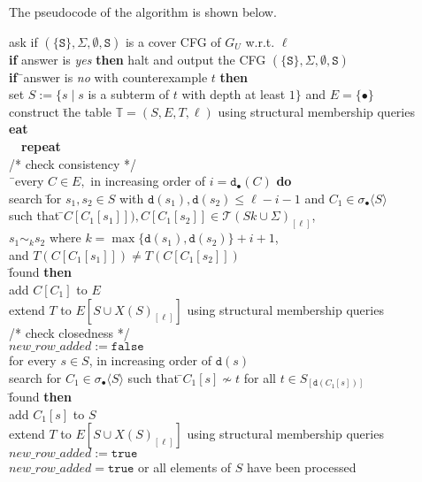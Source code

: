 \documentclass[preprint,12pt,english]{article}
\def\hole{\bullet}
\def\tS{\mathtt{S}}
\def\cT{\mathcal{T}}
\def\depth{\mathtt{d}}
\newcommand\pair[1]{\langle{#1}\rangle}
\begin{document}
The pseudocode of the algorithm is shown below. 
\begin{tabbing}
ask if $(\{\tS\},\Sigma,\emptyset,\tS)$ is a cover CFG of $G_U$ w.r.t. $\ell$\\
{\bf if} answer is {\em yes} {\bf then} halt and output the CFG $(\{\tS\},\Sigma,\emptyset,\tS)$\\
{\bf if}\=\ answer is {\em no} with counterexample $t$ {\bf then}\\
\>set $S:=\{s\mid s$ is a subterm of $t$ with depth at least $1\}$ and $E=\{\hole\}$\\
\>construct \=the table $\mathbb{T}=(S,E,T,\ell)$ using structural membership queries\\
\={\bf{eat}}\\
\>\ \ {\bf repeat}\\
\>\>/* check consistency */\\
\>\=\ every $C\in E,$ in increasing order of $i=\depth_\hole(C)$ {\bf do}\\
\>\>\>search \=for $s_1,s_2\in S$ with $\depth(s_1),\depth(s_2)\leq \ell-i-1$ and $C_1\in\sigma_\hole\pair{S}$\\
\>\>\>\>such that \=$C[C_1[s_1]]), C[C_1[s_2]]\in\cT(Sk\cup\Sigma)_{[\ell]}$,\\
\>\>\>\>\>$s_1\sim_k s_2$ where $k=\max\{\depth(s_1),\depth(s_2)\}+i+1$,\\
\>\>\>\>\>and $T(C[C_1[s_1]])\neq T(C[C_1[s_2]])$\\
\>\> \=found {\bf then}\\
\>\>\>\>add $C[C_1]$ to $E$\\
\>\>\>\>extend $T$ to $E[S\cup X(S)_{[\ell]}]$ using structural membership queries\\
\>\>/* check closedness */\\
\>\>$new\_row\_added:=\mathtt{false}$\\
\> for every $s\in S$, in increasing order of $\depth(s)$\\
\>\>\>search for $C_1\in\sigma_\hole\pair{S}$ such that \=$C_1[s]\nsim t$ for all $t\in S_{[\depth(C_1[s])]}$ \\
\>\> \=found {\bf then}\\
\>\>\>\>add $C_1[s]$ to $S$\\
\>\>\>\>extend $T$ to $E[S\cup X(S)_{[\ell]}]$ using structural membership queries\\
\>\>\>\>$new\_row\_added:=\mathtt{true}$\\
\> $new\_row\_added=\mathtt{true}$ or all elements of $S$ have been processed\\

\end{tabbing}
\end{document}
